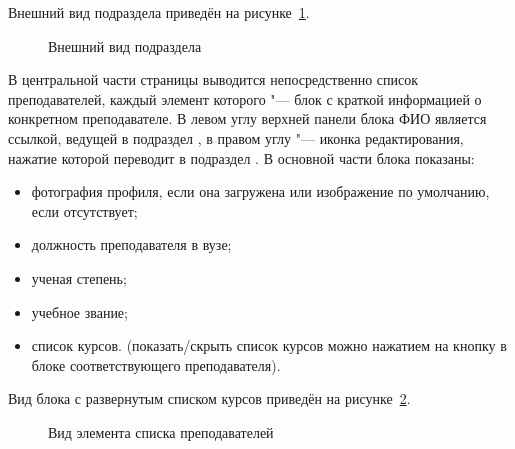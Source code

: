 Внешний вид подраздела приведён на рисунке~\ref{instructor:list}. 

	\begin{figure}[H]
	\caption{Внешний вид подраздела }
	\label{instructor:list}
	\end{figure}
	
В центральной части страницы выводится непосредственно список преподавателей, каждый элемент которого "--- блок с краткой информацией о конкретном преподавателе. В левом углу верхней панели блока ФИО является ссылкой, ведущей в подраздел , в правом углу "--- иконка редактирования, нажатие которой переводит в подраздел . В основной части блока показаны:
\begin{itemize}
	\item фотография профиля, если она загружена или изображение по умолчанию, если отсутствует;
	\item должность преподавателя в вузе;
	\item ученая степень;
	\item учебное звание;
	\item список курсов. (показать/скрыть список курсов можно нажатием на кнопку  в блоке соответствующего преподавателя).
\end{itemize}

Вид блока с развернутым списком курсов приведён на рисунке~\ref{instructor:list_courses}.
	
	\begin{figure}[H]
	\caption{Вид элемента списка преподавателей}
	\label{instructor:list_courses}
	\end{figure}

